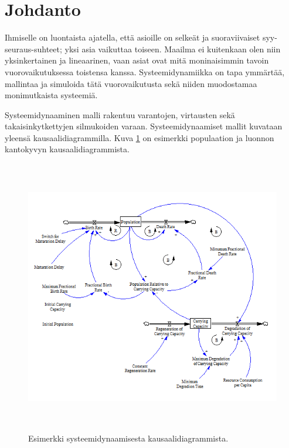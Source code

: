 \documentclass[finnish,12pt,a4paper,pdftex]{article}
\begin{document}
\section{Johdanto}

\thispagestyle{empty}

Ihmiselle on luontaista ajatella, että asioille on selkeät ja suoraviivaiset syy-seuraus-suhteet; yksi asia vaikuttaa toiseen. Maailma ei kuitenkaan olen niin yksinkertainen ja lineaarinen, vaan asiat ovat mitä moninaisimmin tavoin vuorovaikutuksessa toistensa kanssa. Systeemidynamiikka on tapa ymmärtää, mallintaa ja simuloida tätä vuorovaikutusta sekä niiden muodostamaa monimutkaista systeemiä. 


Systeemidynaaminen malli rakentuu varantojen, virtausten sekä takaisinkytkettyjen silmukoiden varaan. Systeemidynaamiset mallit kuvataan yleensä kausaalidiagrammilla.  Kuva \ref{sysdyn_example} on esimerkki populaation ja luonnon kantokyvyn kausaalidiagrammista. 

\begin{figure}[htb]
\centering \includegraphics[height=12cm]{sysdyn_example}
\caption{Esimerkki systeemidynaamisesta kausaalidiagrammista. \label{sysdyn_example}}
\end{figure}
\end{document}

